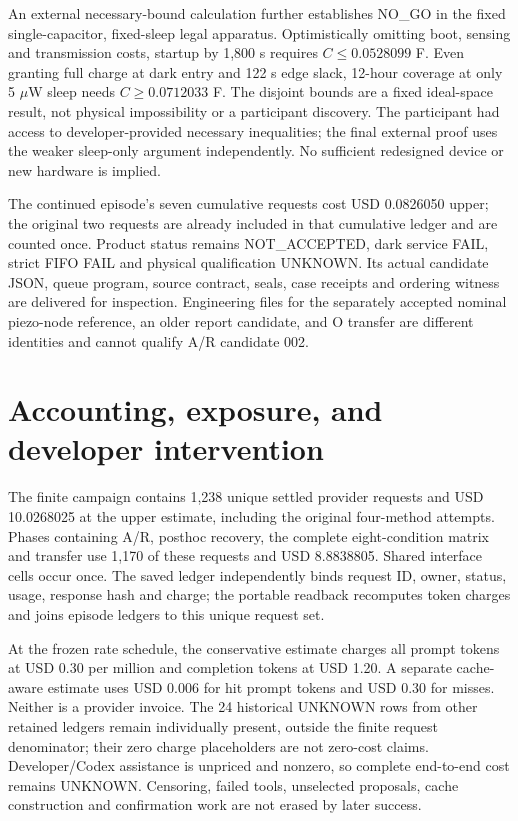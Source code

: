An external necessary-bound calculation further establishes NO\_GO in the
fixed single-capacitor, fixed-sleep legal apparatus. Optimistically omitting
boot, sensing and transmission costs, startup by 1,800 s requires
$C\leq0.0528099$ F. Even granting full charge at dark entry and 122 s edge
slack, 12-hour coverage at only 5 $\mu$W sleep needs
$C\geq0.0712033$ F. The disjoint bounds are a fixed ideal-space result, not
physical impossibility or a participant discovery. The participant had access
to developer-provided necessary inequalities; the final external proof uses
the weaker sleep-only argument independently. No sufficient redesigned device
or new hardware is implied.

The continued episode's seven cumulative requests cost USD 0.0826050 upper;
the original two requests are already included in that cumulative ledger and
are counted once. Product status remains NOT\_ACCEPTED, dark service FAIL,
strict FIFO FAIL and physical qualification UNKNOWN. Its actual candidate
JSON, queue program, source contract, seals, case receipts and ordering witness
are delivered for inspection. Engineering files for the separately accepted
nominal piezo-node reference, an older report candidate, and O transfer are
different identities and cannot qualify A/R candidate 002.

\section{Accounting, exposure, and developer intervention}

The finite campaign contains 1,238 unique settled provider requests and
USD 10.0268025 at the upper estimate, including the original four-method
attempts. Phases containing A/R, posthoc recovery, the complete eight-condition
matrix and transfer use 1,170 of these requests and USD 8.8838805. Shared
interface cells occur once. The saved ledger independently binds request ID,
owner, status, usage, response hash and charge; the portable readback recomputes
token charges and joins episode ledgers to this unique request set.

At the frozen rate schedule, the conservative estimate charges all prompt
tokens at USD 0.30 per million and completion tokens at USD 1.20. A separate
cache-aware estimate uses USD 0.006 for hit prompt tokens and USD 0.30 for
misses. Neither is a provider invoice. The 24 historical UNKNOWN rows from
other retained ledgers remain individually present, outside the finite request
denominator; their zero charge placeholders are not zero-cost claims.
Developer/Codex assistance is unpriced and nonzero, so complete end-to-end
cost remains UNKNOWN. Censoring, failed tools, unselected proposals, cache
construction and confirmation work are not erased by later success.

